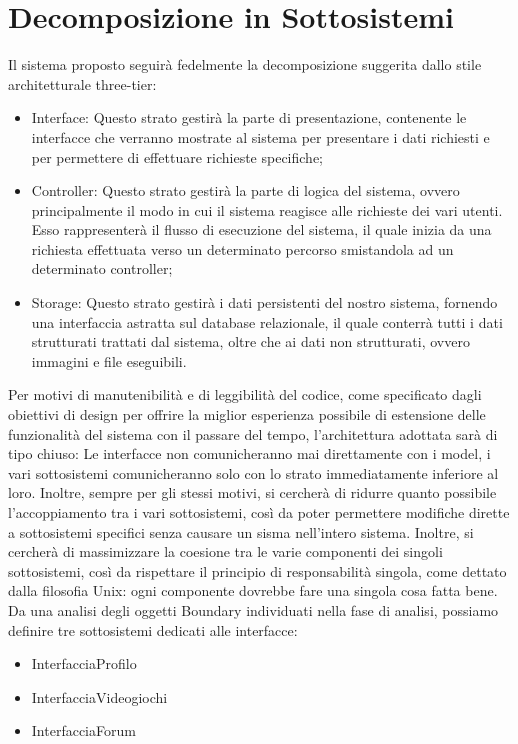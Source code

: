 \section{Decomposizione in Sottosistemi}
Il sistema proposto seguirà fedelmente la decomposizione suggerita dallo stile architetturale three-tier:
\begin{itemize}
	\item Interface: Questo strato gestirà la parte di presentazione, contenente le interfacce che verranno mostrate al sistema per presentare i dati richiesti e per permettere di effettuare richieste specifiche;
	\item Controller: Questo strato gestirà la parte di logica del sistema, ovvero principalmente il modo in cui il sistema reagisce alle richieste dei vari utenti. Esso rappresenterà il flusso di esecuzione del sistema, il quale inizia da una richiesta effettuata verso un determinato percorso smistandola ad un determinato controller;
	\item Storage: Questo strato gestirà i dati persistenti del nostro sistema, fornendo una interfaccia astratta sul database relazionale, il quale conterrà tutti i dati strutturati trattati dal sistema, oltre che ai dati non strutturati, ovvero immagini e file eseguibili.
\end{itemize}
Per motivi di manutenibilità e di leggibilità del codice, come specificato dagli obiettivi di design per offrire la miglior esperienza possibile di estensione delle funzionalità del sistema con il passare del tempo, l’architettura adottata sarà di tipo chiuso: Le interfacce non comunicheranno mai direttamente con i model, i vari sottosistemi comunicheranno solo con lo strato immediatamente inferiore al loro. Inoltre, sempre per gli stessi motivi, si cercherà di ridurre quanto possibile l’accoppiamento tra i vari sottosistemi, così da poter permettere modifiche dirette a sottosistemi specifici senza causare un sisma nell’intero sistema. Inoltre, si cercherà di massimizzare la coesione tra le varie componenti dei singoli sottosistemi, così da rispettare il principio di responsabilità singola, come dettato dalla filosofia Unix: ogni componente dovrebbe fare una singola cosa fatta bene. \\
Da una analisi degli oggetti Boundary individuati nella fase di analisi, possiamo definire tre sottosistemi dedicati alle interfacce:
\begin{itemize}
	\item InterfacciaProfilo
	\item InterfacciaVideogiochi
	\item InterfacciaForum
\end{itemize}
